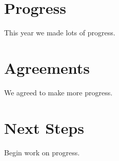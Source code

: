 \documentclass[../minutes.tex]{subfiles}
\begin{document}
\section{Progress}
This year we made lots of progress.

\section{Agreements}
We agreed to make more progress.

\section{Next Steps}
Begin work on progress.

\bib{}
\end{document}
